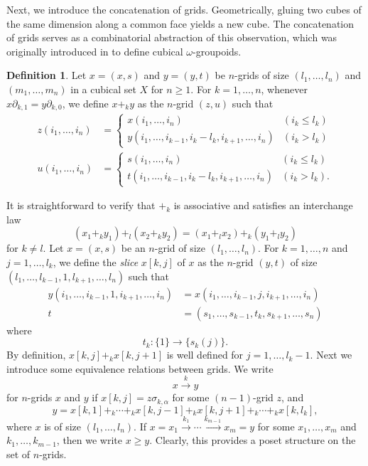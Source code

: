 \documentclass[oneside, 12pt]{amsart}
\numberwithin{equation}{section}
\theoremstyle{plain}
\theoremstyle{definition}
\newtheorem{definition}[theorem]{Definition}
\theoremstyle{remark}
\begin{document}
	
	
	Next, we introduce the concatenation of grids. Geometrically, gluing two cubes of the same dimension along a common face yields a new cube. The concatenation of grids serves as a combinatorial abstraction of this observation, which was originally introduced in \cite{BHS} to define cubical \(\omega\)-groupoids.
	\begin{definition}
		Let $x=(x,s)$ and $y=(y,t)$ be $n$-grids of size $(l_1,\ldots,l_n)$ and $(m_1,\ldots,m_n)$ in a cubical set $X$ for $n\ge 1$. For $k=1,\ldots,n$, whenever $x\partial_{k,1}=y\partial_{k,0}$, we define $x+_ky$ as the $n$-grid $(z,u)$ such that
		\begin{align*}
			z(i_1,\ldots,i_n)&=
			\begin{cases}
				x(i_1,\ldots,i_n)&(i_k\le l_k)\\
				y(i_1,\ldots,i_{k-1},i_k-l_k,i_{k+1},\ldots,i_n)&(i_k>l_k)
			\end{cases}\\
			u(i_1,\ldots,i_n)&=
			\begin{cases}
				s(i_1,\ldots,i_n)&(i_k\le l_k)\\
				t(i_1,\ldots,i_{k-1},i_k-l_k,i_{k+1},\ldots,i_n)&(i_k>l_k).
			\end{cases}
		\end{align*}
	\end{definition}
	
	
	
	It is straightforward to verify that $+_k$ is associative and satisfies an interchange law
	\begin{equation}
		\label{interchange law}
		(x_1+_ky_1)+_l(x_2+_ky_2)=(x_1+_lx_2)+_k(y_1+_ly_2)
	\end{equation}
	for $k\ne l$. Let $x=(x,s)$ be an $n$-grid of size $(l_1,\ldots,l_n)$. For $k=1,\ldots,n$ and $j=1,\ldots,l_k$, we define the \emph{slice} $x[k,j]$ of $x$ as the $n$-grid $(y,t)$ of size $(l_1,\ldots,l_{k-1},1,l_{k+1},\ldots,l_n)$ such that
	\begin{align*}
		y(i_1,\ldots,i_{k-1},1,i_{k+1},\ldots,i_n)&=x(i_1,\ldots,i_{k-1},j,i_{k+1},\ldots,i_n)\\
		t&=(s_1,\ldots,s_{k-1},t_k,s_{k+1},\ldots,s_n)
	\end{align*}
	where 
	\[
	t_k\colon\{1\}\to\{s_k(j)\}.
	\]
	By definition, $x[k,j]+_kx[k,j+1]$ is well defined for $j=1,\ldots,l_k-1$. Next we introduce some equivalence relations between grids. We write
	\[
	x\xrightarrow{k}y
	\]
	for $n$-grids $x$ and $y$ if $x[k,j]=z\sigma_{k,\alpha}$ for some $(n-1)$-grid $z$, and
	\[
	y=x[k,1]+_k\cdots+_kx[k,j-1]+_kx[k,j+1]+_k\cdots+_kx[k,l_k],
	\]
	where $x$ is of size $(l_1,\ldots,l_n)$. If $x=x_1\xrightarrow{k_1}\cdots\xrightarrow{k_{m-1}}x_m=y$ for some $x_1,\ldots,x_m$ and $k_1,\ldots,k_{m-1}$, then we write $x\ge y$. Clearly, this provides a poset structure on the set of $n$-grids.
	
\end{document}
